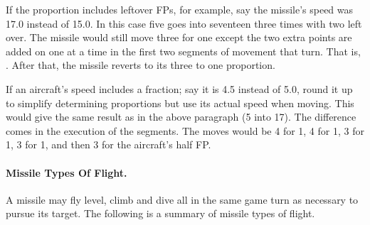 If the proportion includes leftover FPs, for example, say the missile's speed was 17.0 instead of 15.0. In this case five goes into seventeen three times with two left over. The missile would still move three for one except the two extra points are added on one at a time in the first two segments of movement that turn. That is, . After that, the missile reverts to its three to one proportion.

If an aircraft's speed includes a fraction; say it is 4.5 instead of 5.0, round it up to simplify determining proportions but use its actual speed when moving. This would give the same result as in the above paragraph (5 into 17). The difference comes in the execution of the segments. The moves would be 4 for 1, 4 for 1, 3 for 1, 3 for 1, and then 3 for the aircraft's half FP.


\paragraph{Missile Types Of Flight.} A missile may fly level, climb and dive all in the same game turn as necessary to pursue its target. The following is a summary of missile types of flight.

